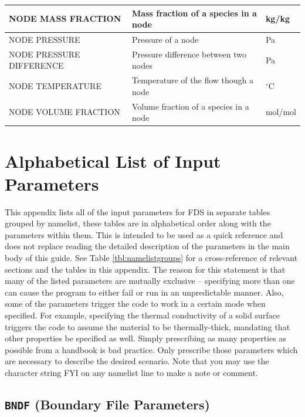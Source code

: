 \documentclass[11pt]{book}
\begin{document}
\begin{longtable}{|l|l|l|@{\extracolsep{\fill}}}
{\ct NODE MASS FRACTION}                        & Mass fraction of a species in a node      &  kg/kg                \\ \hline
{\ct NODE PRESSURE}                             & Pressure of a node                        &       Pa              \\ \hline
{\ct NODE PRESSURE DIFFERENCE}                  & Pressure difference between two nodes     &       Pa              \\ \hline
{\ct NODE TEMPERATURE}                          & Temperature of the flow though a node     & $^\circ$C             \\ \hline
{\ct NODE VOLUME FRACTION}                      & Volume fraction of a species in a node    &  mol/mol              \\ \hline
\end{longtable}



\chapter{Alphabetical List of Input Parameters}

This appendix lists all of the input parameters for FDS in separate tables grouped by namelist, these tables are in alphabetical order along with the parameters within them. This is intended to be used as a quick reference and does not replace reading the detailed description of the parameters in the main body of this guide. See Table \ref{tbl:namelistgroups} for a cross-reference of relevant sections and the tables in this appendix. The reason for this statement is that many of the listed parameters are mutually exclusive -- specifying more than one can cause the program to either fail or run in an unpredictable manner. Also, some of the parameters trigger the code to work in a certain mode when specified. For example, specifying the thermal conductivity of a solid surface triggers the code to assume the material to be thermally-thick, mandating that other
properties be specified as well. Simply prescribing as many properties as possible from a handbook is bad practice. Only prescribe those parameters which are necessary to describe the desired scenario. Note that you may use the character string {\ct FYI} on any namelist line to make a note or comment.




\section{\texorpdfstring{{\tt BNDF}}{BNDF} (Boundary File Parameters)}
\end{document}
